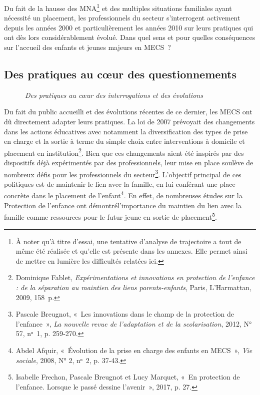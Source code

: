 \documentclass[
  12,
  a4paper,
]{report}
\begin{document}
Du fait de la hausse des MNA\footnote{À noter qu'à titre d'essai, une
  tentative d'analyse de trajectoire a tout de même été réalisée et
  qu'elle est présente dans les annexes. Elle permet ainsi de mettre en
  lumière les difficultés relatées ici.} et des multiples situations
familiales ayant nécessité un placement, les professionnels du secteur
s'interrogent activement depuis les années 2000 et particulièrement les
années 2010 sur leurs pratiques qui ont dès lors considérablement
évolué. Dans quel sens et pour quelles conséquences sur l'accueil des
enfants et jeunes majeurs en MECS~?

\hypertarget{des-pratiques-au-cux153ur-des-questionnements}{%
\subsection{Des pratiques au cœur des
questionnements}\label{des-pratiques-au-cux153ur-des-questionnements}}

~~~~~~\emph{Des pratiques au cœur des interrogations et des évolutions}

Du fait du public accueilli et des évolutions récentes de ce dernier,
les MECS ont dû directement adapter leurs pratiques. La loi de 2007
prévoyait des changements dans les actions éducatives avec notamment la
diversification des types de prise en charge et la sortie à terme du
simple choix entre interventions à domicile et placement en
institution\footnote{Dominique Fablet, \emph{Expérimentations et
  innovations en protection de l'enfance : de la séparation au maintien
  des liens parents-enfants}, {Paris}, {L'Harmattan}, 2009, 158~p.}.
Bien que ces changements aient été inspirés par des dispositifs déjà
expérimentés par des professionnels, leur mise en place soulève de
nombreux défis pour les professionnels du secteur\footnote{Pascale
  Breugnot, {«~Les innovations dans le champ de la protection de
  l'enfance~»}, \emph{La nouvelle revue de l'adaptation et de la
  scolarisation}, 2012, N° 57, nᵒ~1, p. 259‑270.}. L'objectif principal
de ces politiques est de maintenir le lien avec la famille, en lui
conférant une place concrète dans le placement de l'enfant\footnote{Abdel
  Afquir, {«~Évolution de la prise en charge des enfants en MECS~»},
  \emph{Vie sociale}, 2008, N° 2, nᵒ~2, p. 37‑43.}. En effet, de
nombreuses études sur la Protection de l'enfance ont
démontrél'importance du maintien du lien avec la famille comme
ressources pour le futur jeune en sortie de placement\footnote{Isabelle
  Frechon, Pascale Breugnot et Lucy Marquet, {«~En protection de
  l'enfance. Lorsque le passé dessine l'avenir~»}, 2017, p. 27.}.
\end{document}
